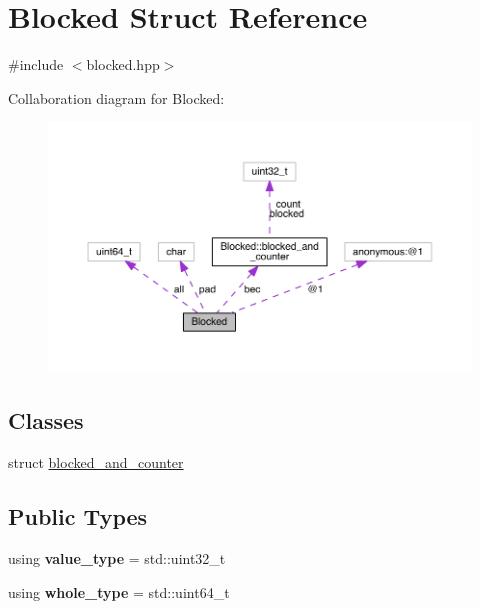 \hypertarget{struct_blocked}{}\section{Blocked Struct Reference}
\label{struct_blocked}


{\ttfamily \#include $<$blocked.\+hpp$>$}



Collaboration diagram for Blocked\+:
\nopagebreak
\begin{figure}[H]
\begin{center}
\leavevmode
\includegraphics[width=350pt]{struct_blocked__coll__graph}
\end{center}
\end{figure}
\subsection*{Classes}
\begin{DoxyCompactItemize}
\item 
struct \hyperlink{struct_blocked_1_1blocked__and__counter}{blocked\+\_\+and\+\_\+counter}
\end{DoxyCompactItemize}
\subsection*{Public Types}
\begin{DoxyCompactItemize}
\item 
\hypertarget{struct_blocked_a5c1d9f4d77e4940785c83a43ce81729f}{}\label{struct_blocked_a5c1d9f4d77e4940785c83a43ce81729f} 
using {\bfseries value\+\_\+type} = std\+::uint32\+\_\+t
\item 
\hypertarget{struct_blocked_a0b0291787b8f79d99ae9a60ad84cd3e0}{}\label{struct_blocked_a0b0291787b8f79d99ae9a60ad84cd3e0} 
using {\bfseries whole\+\_\+type} = std\+::uint64\+\_\+t
\end{DoxyCompactItemize}
